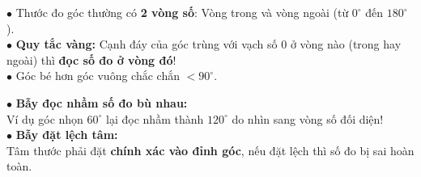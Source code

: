 \documentclass[14pt,a4paper,oneside]{extbook}
\begin{document}
\noindent
\begin{minipage}[t]{0.54\textwidth}
  \begin{tcolorbox}[
    enhanced,
    title={\footnotesize\bfseries\color{white}\faEye\ Mẹo chọn đúng vòng số trên thước đo độ},
    colback=green!3!white,
    colframe=green!60!black,
    arc=2.5mm, boxrule=0.8pt, top=1.8mm, bottom=1.8mm, left=2.2mm, right=2.2mm
  ]
    \footnotesize
    $\bullet$ Thước đo góc thường có \textbf{2 vòng số}: Vòng trong và vòng ngoài (từ $0^\circ$ đến $180^\circ$).\\
    $\bullet$ \textbf{Quy tắc vàng:} Cạnh đáy của góc trùng với vạch số 0 ở vòng nào (trong hay ngoài) thì \textbf{đọc số đo ở vòng đó}!\\
    $\bullet$ Góc bé hơn góc vuông chắc chắn $< 90^\circ$.
  \end{tcolorbox}
\end{minipage}%
\hfill
\begin{minipage}[t]{0.44\textwidth}
  \begin{tcolorbox}[
    enhanced,
    title={\footnotesize\bfseries\color{white}\faExclamationTriangle\ Mẹo tránh bẫy trắc nghiệm},
    colback=red!2!white,
    colframe=red!70!black,
    arc=2.5mm, boxrule=0.8pt, top=1.8mm, bottom=1.8mm, left=2.2mm, right=2.2mm
  ]
    \footnotesize
    $\bullet$ \textbf{Bẫy đọc nhầm số đo bù nhau:}\\
    Ví dụ góc nhọn $60^\circ$ lại đọc nhầm thành $120^\circ$ do nhìn sang vòng số đối diện!\\
    $\bullet$ \textbf{Bẫy đặt lệch tâm:}\\
    Tâm thước phải đặt \textbf{chính xác vào đỉnh góc}, nếu đặt lệch thì số đo bị sai hoàn toàn.
  \end{tcolorbox}
\end{minipage}
\end{document}
